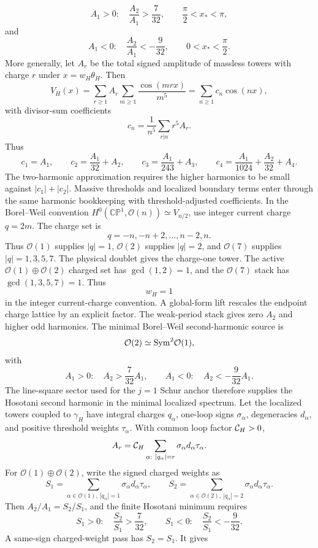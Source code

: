 \documentclass[11pt]{article}
\theoremstyle{definition}
\theoremstyle{remark}
\newcommand{\CP}{\mathbb{CP}}
\newcommand{\cO}{\mathcal O}
\begin{document}
\[
  A_1>0:\quad
  \frac{A_2}{A_1}>\frac{7}{32},
  \qquad \frac{\pi}{2}<x_*<\pi,
\]
and
\[
  A_1<0:\quad
  \frac{A_2}{A_1}<-\frac{9}{32},
  \qquad 0<x_*<\frac{\pi}{2}.
\]
More generally, let \(A_r\) be the total signed amplitude of massless towers
with charge \(r\) under \(x=w_H\theta_H\).  Then
\[
  V_H(x)
  =
  \sum_{r\ge1}A_r
  \sum_{m\ge1}\frac{\cos(mrx)}{m^5}
  =
  \sum_{n\ge1}c_n\cos(nx),
\]
with divisor-sum coefficients
\[
  c_n=\frac{1}{n^5}\sum_{r|n}r^5A_r .
\]
Thus
\[
  c_1=A_1,\qquad
  c_2=\frac{A_1}{32}+A_2,\qquad
  c_3=\frac{A_1}{243}+A_3,\qquad
  c_4=\frac{A_1}{1024}+\frac{A_2}{32}+A_4 .
\]
The two-harmonic approximation requires the higher harmonics to be small
against \(|c_1|+|c_2|\).  Massive thresholds and localized boundary terms
enter through the same harmonic bookkeeping with threshold-adjusted
coefficients.
In the Borel--Weil convention \(H^0(\CP^1,\cO(n))\simeq V_{n/2}\), use
integer current charge \(q=2m\).  The charge set is
\[
  q=-n,-n+2,\ldots,n-2,n.
\]
Thus \(\cO(1)\) supplies \(|q|=1\), \(\cO(2)\) supplies \(|q|=2\), and
\(\cO(7)\) supplies \(|q|=1,3,5,7\).  The physical doublet gives the
charge-one tower.  The active \(\cO(1)\oplus\cO(2)\) charged set has
\(\gcd(1,2)=1\), and the \(\cO(7)\) stack has \(\gcd(1,3,5,7)=1\).  Thus
\[
  w_H=1
\]
in the integer current-charge convention.  A global-form lift rescales the
endpoint charge lattice by an explicit factor.  The weak-period stack gives
zero \(A_2\) and higher odd harmonics.  The minimal Borel--Weil
second-harmonic source is
\[
  \cO(2)\simeq {\rm Sym}^2\cO(1),
\]
with
\[
  A_1>0:\quad A_2>\frac{7}{32}A_1,
  \qquad
  A_1<0:\quad A_2<-\frac{9}{32}A_1.
\]
The line-square sector used for the \(j=1\) Schur anchor therefore supplies
the Hosotani second harmonic in the minimal localized spectrum.
Let the localized towers coupled to \(\gamma_H\) have integral charges
\(q_\alpha\), one-loop signs \(\sigma_\alpha\), degeneracies \(d_\alpha\),
and positive threshold weights \(\tau_\alpha\).  With common loop factor
\({\cal C}_H>0\),
\[
  A_r=
  {\cal C}_H
  \sum_{\alpha:\ |q_\alpha|=r}
  \sigma_\alpha d_\alpha\tau_\alpha .
\]
For \(\cO(1)\oplus\cO(2)\), write the signed charged weights as
\[
  S_1=
  \sum_{\alpha\in\cO(1),\ |q_\alpha|=1}
  \sigma_\alpha d_\alpha\tau_\alpha,
  \qquad
  S_2=
  \sum_{\alpha\in\cO(2),\ |q_\alpha|=2}
  \sigma_\alpha d_\alpha\tau_\alpha .
\]
Then \(A_2/A_1=S_2/S_1\), and the finite Hosotani minimum requires
\[
  S_1>0:\quad \frac{S_2}{S_1}>\frac{7}{32},
  \qquad
  S_1<0:\quad \frac{S_2}{S_1}<-\frac{9}{32}.
\]
A same-sign charged-weight pass has \(S_2=S_1\).  It gives
\end{document}
